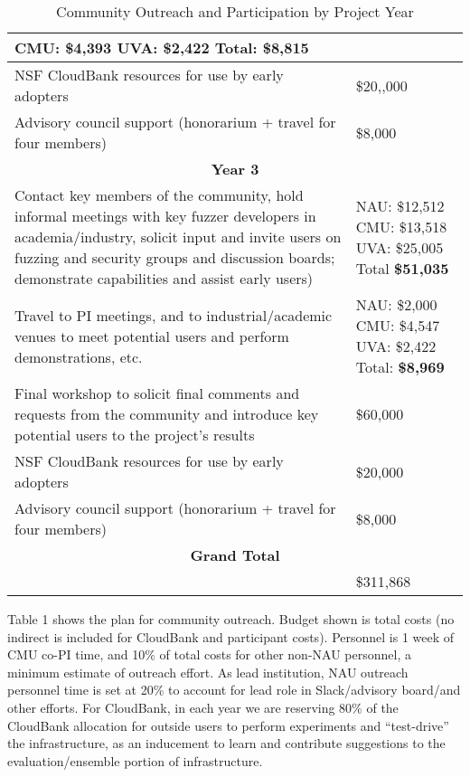 \documentclass[12pt]{article}
\begin{document}
\begin{table}
\begin{tabular}{|p{12cm}|p{3cm}|}
                                                       CMU: \$4,393
                                                       UVA:  \$2,422
                                                       Total: \textbf{\$8,815}\\
    \hline
    NSF CloudBank resources for use by early adopters & \$20,,000 \\
    \hline 
    Advisory council support (honorarium + travel for four members) & \$8,000 \\    
    \hline
    \hline
    \multicolumn{2}{c}{{\bf Year 3}} \\
    \hline
    \hline
   Contact key members of the community, hold informal meetings with
    key fuzzer developers in academia/industry, solicit input and
    invite users
    on fuzzing and security groups and discussion boards; demonstrate
    capabilities and assist early users) &  NAU:  \$12,512 CMU: \$13,518 UVA: \$25,005
                                                      Total \textbf{ \$51,035} \\
    \hline
    Travel to PI meetings, and to industrial/academic venues to meet
    potential users and perform demonstrations, etc. & NAU: \$2,000
                                                       CMU: \$4,547
                                                       UVA:  \$2,422
                                                       Total: \textbf{\$8,969}\\
    \hline    
    Final workshop to solicit final comments and requests from the
    community and introduce key potential users to the project’s
    results & \$60,000 \\
    \hline
    NSF CloudBank resources for use by early adopters & \$20,000 \\
    \hline 
    Advisory council support (honorarium + travel for four members) & \$8,000 \\    
    \hline
    \hline
    \multicolumn{2}{c}{{\bf Grand Total}} \\
    \hline
                   &     \$311,868 \\
                     \hline
 
  \end{tabular}
\label{outreach}
  \caption{Community Outreach and Participation by Project Year}
  
\end{table}


Table 1 shows the plan for community
outreach.   Budget shown is total costs 
 (no indirect is included for CloudBank and participant costs).   Personnel is 1 week of CMU co-PI time, and 10\%
of total costs for other non-NAU personnel, a
minimum estimate of outreach effort.  As lead institution, NAU
outreach personnel time is set at 20\% to account for lead role in
Slack/advisory board/and other efforts.  For CloudBank, in each year we
are reserving 80\% of the CloudBank allocation for outside users to
perform experiments and ``test-drive'' the infrastructure, as an
inducement to learn and contribute suggestions to the
evaluation/ensemble portion of infrastructure.
\end{document}

